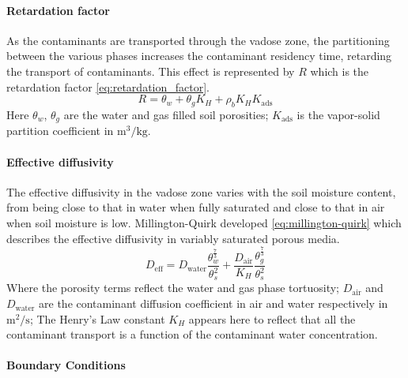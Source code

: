 \paragraph{Retardation factor}

As the contaminants are transported through the vadose zone, the partitioning between the various phases increases the contaminant residency time, retarding the transport of contaminants.
This effect is represented by $R$ which is the retardation factor \eqref{eq:retardation_factor}.
\begin{equation}\label{eq:retardation_factor}
  R = \theta_w + \theta_g K_H + \rho_b K_H K_\mathrm{ads}
\end{equation}
Here $\theta_w$, $\theta_g$ are the water and gas filled soil porosities;
$K_\mathrm{ads}$ is the vapor-solid partition coefficient in $\mathrm{m^3/kg}$.\par

\paragraph{Effective diffusivity}

The effective diffusivity in the vadose zone varies with the soil moisture content, from being close to that in water when fully saturated and close to that in air when soil moisture is low.
Millington-Quirk developed \eqref{eq:millington-quirk} which describes the effective diffusivity in variably saturated porous media.
\begin{equation}\label{eq:millington-quirk}
  D_\mathrm{eff} = D_\mathrm{water} \frac{\theta_w^\frac{7}{3}}{\theta_s^2} + \frac{D_\mathrm{air}}{K_H} \frac{\theta_g^\frac{7}{3}}{\theta_s^2}
\end{equation}
Where the porosity terms reflect the water and gas phase tortuosity;
$D_\mathrm{air}$ and $D_\mathrm{water}$ are the contaminant diffusion coefficient in air and water respectively in $\mathrm{m^2/s}$;
The Henry's Law constant $K_H$ appears here to reflect that all the contaminant transport is a function of the contaminant water concentration.\par

\paragraph{Boundary Conditions}

